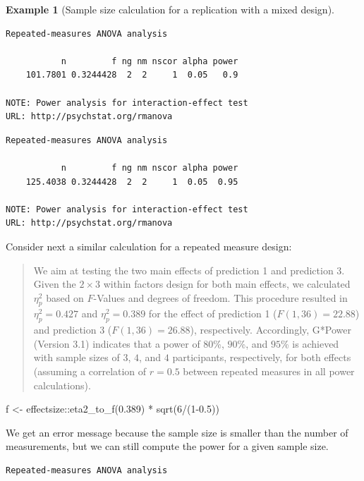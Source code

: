 \documentclass[
  11pt,
  letterpaper,
]{scrbook}
\newenvironment{Shaded}{\begin{snugshade}}{\end{snugshade}}
\newcommand{\DecValTok}[1]{\textcolor[rgb]{0.68,0.00,0.00}{#1}}
\newcommand{\FloatTok}[1]{\textcolor[rgb]{0.68,0.00,0.00}{#1}}
\newcommand{\FunctionTok}[1]{\textcolor[rgb]{0.28,0.35,0.67}{#1}}
\newcommand{\NormalTok}[1]{\textcolor[rgb]{0.00,0.23,0.31}{#1}}
\newcommand{\OtherTok}[1]{\textcolor[rgb]{0.00,0.23,0.31}{#1}}
\newcommand{\SpecialCharTok}[1]{\textcolor[rgb]{0.37,0.37,0.37}{#1}}
\theoremstyle{definition}
\theoremstyle{definition}
\newtheorem{example}{Example}[chapter]
\theoremstyle{remark}
\begin{document}
\begin{example}[Sample size calculation for a replication with a mixed
design]
\begin{verbatim}
Repeated-measures ANOVA analysis

           n         f ng nm nscor alpha power
    101.7801 0.3244428  2  2     1  0.05   0.9

NOTE: Power analysis for interaction-effect test
URL: http://psychstat.org/rmanova
\end{verbatim}

\begin{verbatim}
Repeated-measures ANOVA analysis

           n         f ng nm nscor alpha power
    125.4038 0.3244428  2  2     1  0.05  0.95

NOTE: Power analysis for interaction-effect test
URL: http://psychstat.org/rmanova
\end{verbatim}

Consider next a similar calculation for a repeated measure design:

\begin{quote}
We aim at testing the two main effects of prediction 1 and prediction 3.
Given the \(2 \times 3\) within factors design for both main effects, we
calculated \(\eta^2_p\) based on \(F\)-Values and degrees of freedom.
This procedure resulted in \(\eta^2_p=0.427\) and \(\eta^2_p=0.389\) for
the effect of prediction 1 (\(F(1, 36)=22.88\)) and prediction 3
(\(F(1, 36)=26.88\)), respectively. Accordingly, G*Power (Version 3.1)
indicates that a power of \(80\)\%, \(90\)\%, and \(95\)\% is achieved
with sample sizes of \(3\), \(4\), and \(4\) participants, respectively,
for both effects (assuming a correlation of \(r=0.5\) between repeated
measures in all power calculations).
\end{quote}

\begin{Shaded}
\begin{Highlighting}[]
\NormalTok{f }\OtherTok{\textless{}{-}}\NormalTok{ effectsize}\SpecialCharTok{::}\FunctionTok{eta2\_to\_f}\NormalTok{(}\FloatTok{0.389}\NormalTok{) }\SpecialCharTok{*} \FunctionTok{sqrt}\NormalTok{(}\DecValTok{6}\SpecialCharTok{/}\NormalTok{(}\DecValTok{1}\FloatTok{{-}0.5}\NormalTok{))}
\end{Highlighting}
\end{Shaded}

We get an error message because the sample size is smaller than the
number of measurements, but we can still compute the power for a given
sample size.

\begin{verbatim}
Repeated-measures ANOVA analysis


\end{verbatim}
\end{example}
\end{document}
